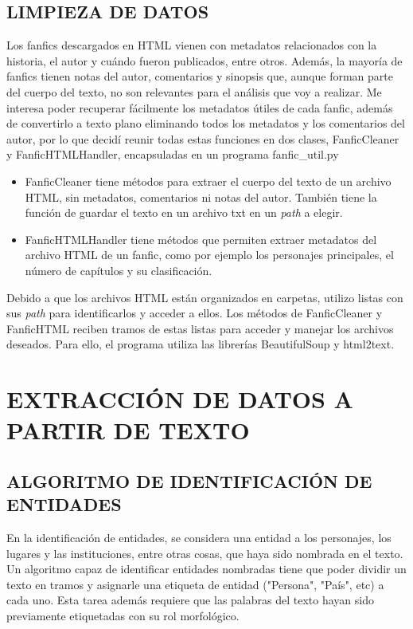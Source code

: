\documentclass{pre-tfg}
\begin{document}
\subsection{LIMPIEZA DE DATOS}
\label{sec:limpiezadatos}
Los fanfics descargados en HTML vienen con metadatos relacionados con la historia, el autor y cuándo fueron publicados, entre otros. Además, la mayoría de fanfics tienen notas del autor, comentarios y sinopsis que, aunque forman parte del cuerpo del texto, no son relevantes para el análisis que voy a realizar.
Me interesa poder recuperar fácilmente los metadatos útiles de cada fanfic, además de convertirlo a texto plano eliminando todos los metadatos y los comentarios del autor, por lo que decidí reunir todas estas funciones en dos clases, FanficCleaner y FanficHTMLHandler, encapsuladas en un programa fanfic\_util.py

\begin{itemize}
	\item FanficCleaner tiene métodos para extraer el cuerpo del texto de un archivo HTML, sin metadatos, comentarios ni notas del autor. También tiene la función de guardar el texto en un archivo txt en un \textit{path} a elegir.
	\item FanficHTMLHandler tiene métodos que permiten extraer metadatos del archivo HTML de un fanfic, como por ejemplo los personajes principales, el número de capítulos y su clasificación.
\end{itemize}

Debido a que los archivos HTML están organizados en carpetas, utilizo listas con sus \textit{path} para identificarlos y acceder a ellos. Los métodos de FanficCleaner y FanficHTML reciben tramos de estas listas para acceder y manejar los archivos deseados.
Para ello, el programa utiliza las librerías BeautifulSoup y html2text.

\section {EXTRACCIÓN DE DATOS A PARTIR DE TEXTO}

\subsection{ALGORITMO DE IDENTIFICACIÓN DE ENTIDADES}

En la identificación de entidades, se considera una entidad a los personajes, los lugares y las instituciones, entre otras cosas, que haya sido nombrada en el texto. Un algoritmo capaz de identificar entidades nombradas tiene que poder dividir un texto en tramos y asignarle una etiqueta de entidad ("Persona", "País", etc) a cada uno. Esta tarea además requiere que las palabras del texto hayan sido previamente etiquetadas con su rol morfológico.
\end{document}
